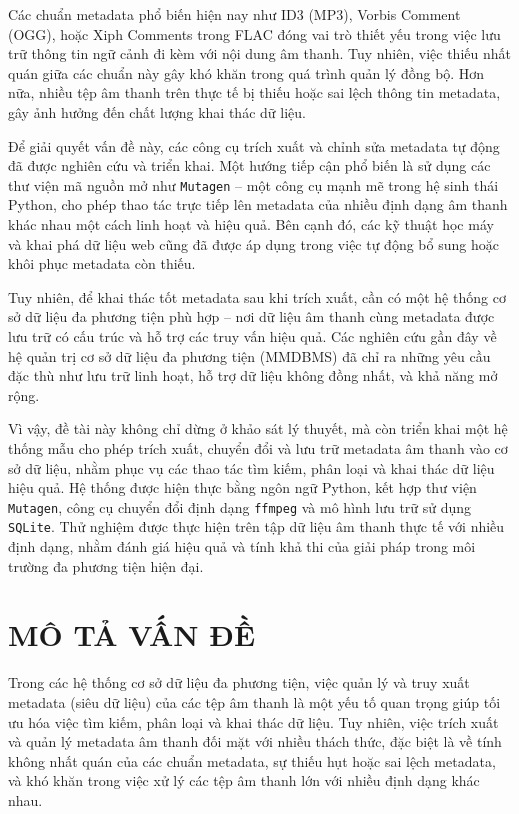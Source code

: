 \documentclass[conference]{IEEEtran}
\begin{document}
Các chuẩn metadata phổ biến hiện nay như ID3 (MP3), Vorbis Comment (OGG), hoặc Xiph Comments trong FLAC đóng vai trò thiết yếu trong việc lưu trữ thông tin ngữ cảnh đi kèm với nội dung âm thanh. Tuy nhiên, việc thiếu nhất quán giữa các chuẩn này gây khó khăn trong quá trình quản lý đồng bộ. Hơn nữa, nhiều tệp âm thanh trên thực tế bị thiếu hoặc sai lệch thông tin metadata, gây ảnh hưởng đến chất lượng khai thác dữ liệu.

Để giải quyết vấn đề này, các công cụ trích xuất và chỉnh sửa metadata tự động đã được nghiên cứu và triển khai. Một hướng tiếp cận phổ biến là sử dụng các thư viện mã nguồn mở như \texttt{Mutagen} – một công cụ mạnh mẽ trong hệ sinh thái Python, cho phép thao tác trực tiếp lên metadata của nhiều định dạng âm thanh khác nhau một cách linh hoạt và hiệu quả. Bên cạnh đó, các kỹ thuật học máy và khai phá dữ liệu web cũng đã được áp dụng trong việc tự động bổ sung hoặc khôi phục metadata còn thiếu.

Tuy nhiên, để khai thác tốt metadata sau khi trích xuất, cần có một hệ thống cơ sở dữ liệu đa phương tiện phù hợp – nơi dữ liệu âm thanh cùng metadata được lưu trữ có cấu trúc và hỗ trợ các truy vấn hiệu quả. Các nghiên cứu gần đây về hệ quản trị cơ sở dữ liệu đa phương tiện (MMDBMS) đã chỉ ra những yêu cầu đặc thù như lưu trữ linh hoạt, hỗ trợ dữ liệu không đồng nhất, và khả năng mở rộng.

Vì vậy, đề tài này không chỉ dừng ở khảo sát lý thuyết, mà còn triển khai một hệ thống mẫu cho phép trích xuất, chuyển đổi và lưu trữ metadata âm thanh vào cơ sở dữ liệu, nhằm phục vụ các thao tác tìm kiếm, phân loại và khai thác dữ liệu hiệu quả. Hệ thống được hiện thực bằng ngôn ngữ Python, kết hợp thư viện \texttt{Mutagen}, công cụ chuyển đổi định dạng \texttt{ffmpeg} và mô hình lưu trữ sử dụng \texttt{SQLite}. Thử nghiệm được thực hiện trên tập dữ liệu âm thanh thực tế với nhiều định dạng, nhằm đánh giá hiệu quả và tính khả thi của giải pháp trong môi trường đa phương tiện hiện đại.


\section{MÔ TẢ VẤN ĐỀ}

Trong các hệ thống cơ sở dữ liệu đa phương tiện, việc quản lý và truy xuất metadata (siêu dữ liệu) của các tệp âm thanh là một yếu tố quan trọng giúp tối ưu hóa việc tìm kiếm, phân loại và khai thác dữ liệu. Tuy nhiên, việc trích xuất và quản lý metadata âm thanh đối mặt với nhiều thách thức, đặc biệt là về tính không nhất quán của các chuẩn metadata, sự thiếu hụt hoặc sai lệch metadata, và khó khăn trong việc xử lý các tệp âm thanh lớn với nhiều định dạng khác nhau.
\end{document}

